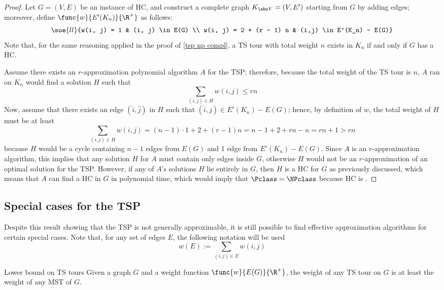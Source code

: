 \documentclass[a4paper, 12pt]{report}
\begin{document}
    \begin{proof}
        Let $G = (V, E)$ be an instance of HC, and construct a complete graph $K_{\abs V} = (V, E')$ starting from $G$ by adding edges; moreover, define $\func{w}{E'(K_n)}{\R^+}$ as follows: $$\soe{ll}{w(i, j) = 1 & (i, j) \in E(G) \\ w(i, j) = 2 + (r - 1) n & (i,j) \in E'(K_n) - E(G)}$$ Note that, for the same reasoning applied in the proof of \cref{tsp np compl}, a TS tour with total weight $n$ exists in $K_n$ if and only if $G$ has a HC.

        Assume there exists an $r$-approximation polynomial algorithm $A$ for the TSP; therefore, because the total weight of the TS tour is $n$, $A$ ran on $K_n$ would find a solution $H$ such that $$\sum_{(i, j) \in H} {w(i, j)} \le rn$$ Now, assume that there exists an edge $(\hat i, \hat j)$ in $H$ such that $(\hat i, \hat j) \in E'(K_n) - E(G)$; hence, by definition of $w$, the total weight of $H$ must be at least $$\sum_{(i, j) \in H}{w(i, j)} = (n - 1) \cdot 1  + 2 + (r - 1)n = n - 1 + 2 + rn - n = rn + 1 > rn$$ because $H$ would be a cycle containing $n - 1$ edges from $E(G)$ and 1 edge from $E'(K_n) - E(G)$. Since $A$ is an $r$-approximation algorithm, this implies that any solution $H$ for $A$ must contain only edges inside $G$, otherwise $H$ would not be an $r$-approximation of an optimal solution for the TSP. However, if any of $A$'s solutions $H$ lie entirely in $G$, then $H$ is a HC for $G$ as previously discussed, which means that $A$ can find a HC in $G$ in polynomial time, which would imply that $\Pclass = \NPclass$ because HC is \NPComplete.
    \end{proof}

    \subsection{Special cases for the TSP}

    Despite this result showing that the TSP is not generally approximable, it is still possible to find effective approximation algorithms for certain special cases. Note that, for any set of edges $E$, the following notation will be used $$w(E) := \sum_{(i, j) \in E}{w(i,j)}$$
    
    \begin{framedlem}[label={tsp bound}]{Lower bound on TS tours}
        Given a graph $G$ and a weight function $\func{w}{E(G)}{\R^+}$, the weight of any TS tour on $G$ is at least the weight of any MST of $G$.
    \end{framedlem}
\end{document}
